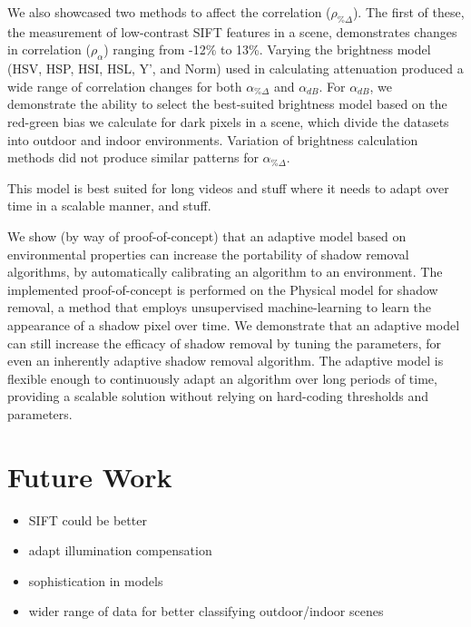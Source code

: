 We also showcased two methods to affect the correlation ($\rho_{\%\Delta}$). The first of these, the measurement of low-contrast SIFT features in a scene, demonstrates changes in correlation ($\rho_{\alpha}$) ranging from -12\% to 13\%. Varying the brightness model (HSV, HSP, HSI, HSL, Y', and Norm) used in calculating attenuation produced a wide range of correlation changes for both $\alpha_{\%\Delta}$ and $\alpha_{dB}$. For $\alpha_{dB}$, we demonstrate the ability to select the best-suited brightness model based on the red-green bias we calculate for dark pixels in a scene, which divide the datasets into outdoor and indoor environments. Variation of brightness calculation methods did not produce similar patterns for $\alpha_{\%\Delta}$.

This model is best suited for long videos and stuff where it needs to adapt over time in a scalable manner, and stuff.

We show (by way of proof-of-concept) that an adaptive model based on environmental properties can increase the portability of shadow removal algorithms, by automatically calibrating an algorithm to an environment. The implemented proof-of-concept is performed on the Physical model for shadow removal, a method that employs unsupervised machine-learning to learn the appearance of a shadow pixel over time. We demonstrate that an adaptive model can still increase the efficacy of shadow removal by tuning the parameters, for even an inherently adaptive shadow removal algorithm. The adaptive model is flexible enough to continuously adapt an algorithm over long periods of time, providing a scalable solution without relying on hard-coding thresholds and parameters. 

\section{Future Work}

\begin{itemize}

\item SIFT could be better
\item adapt illumination compensation
\item sophistication in models
\item wider range of data for better classifying outdoor/indoor scenes

\end{itemize}
